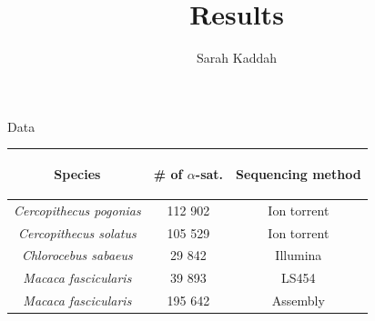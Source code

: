 \documentclass[11pt]{beamer}
\author{Sarah Kaddah}
\title{Results}
\begin{document}
\begin{frame}
\titlepage
\end{frame}

\begin{frame}{Data}
\begin{center}
			\medbreak						
			\begin{tabular}{|c|c|c|}
			\hline
			\begin{bf}Species\end{bf} & \begin{bf}\# of $\alpha$-sat.\end{bf} & \begin{bf}Sequencing method\end{bf}\\
			\hline
			\textit{Cercopithecus pogonias} & 112 902 & Ion torrent\\
			\hline
			\textit{Cercopithecus solatus} & 105 529 & Ion torrent\\
			\hline
			\textit{Chlorocebus sabaeus} & 29 842 & Illumina\\
			\hline
			\textit{Macaca fascicularis} & 39 893 & LS454\\
			\hline
			\textit{Macaca fascicularis} & 195 642 & Assembly\\
			\hline			
			\end{tabular}										
		\end{center}
\end{frame}
\end{document}
